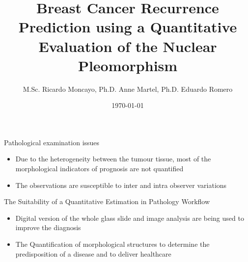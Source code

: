 \documentclass[usenames,dvipsnames]{beamer}
\author{M.Sc. Ricardo Moncayo, Ph.D. Anne Martel, Ph.D. Eduardo Romero}
\title{Breast Cancer Recurrence Prediction using a Quantitative Evaluation of the Nuclear Pleomorphism}
\institute{Departamento Ingeniería \\ Eléctrica}
\date{\today}
\begin{document}
\begin{frame}[plain]
\maketitle
\small
{\centering\itshape \par}
\par\medskip

\end{frame}


\begin{frame}{Pathological examination issues}
	\begin{itemize}
	 \item Due to the heterogeneity between the tumour tissue, most of the morphological indicators of prognosis are not quantified
     \pause
	 \item The observations are susceptible to inter and intra observer variations
	 
	\end{itemize}
\end{frame}

\begin{frame}{The Suitability of a Quantitative Estimation in Pathology Workflow}
 \begin{itemize}
  \item Digital version of the whole glass slide and image analysis are being used to improve the diagnosis
  \pause

  \item The Quantification of morphological structures to determine the predisposition of a disease and to deliver healthcare%
  
  
  
 \end{itemize}
\end{frame}
\end{document}
